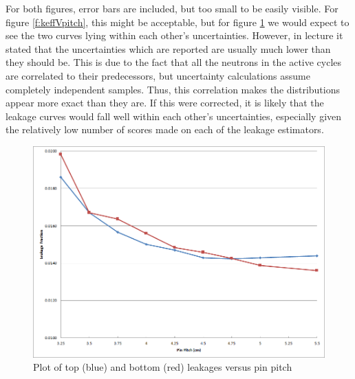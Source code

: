 For both figures, error bars are included, but too small to be easily visible.  For figure \ref{f:keffVpitch}, this might be acceptable, but for figure \ref{f:leakVpitch} we would expect to see the two curves lying within each other's uncertainties.  However, in lecture it stated that the uncertainties which are reported are usually much lower than they should be.  This is due to the fact that all the neutrons in the active cycles are correlated to their predecessors, but uncertainty calculations assume completely independent samples.  Thus, this correlation makes the distributions appear more exact than they are.  If this were corrected, it is likely that the leakage curves would fall well within each other's uncertainties, especially given the relatively low number of scores made on each of the leakage estimators.

\begin{figure}[H]
\centering
\includegraphics[width=0.8\linewidth]{images/leakage_v_pitch.png}
\caption{Plot of top (blue) and bottom (red) leakages versus pin pitch}
\label{f:leakVpitch}
\end{figure}
